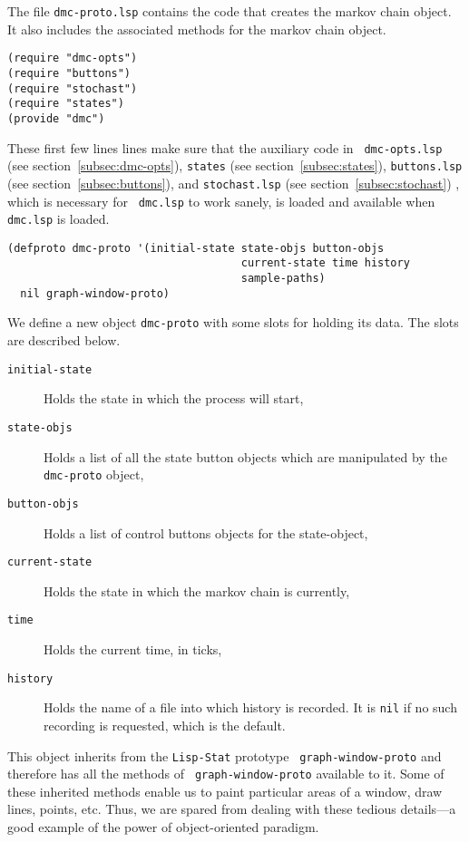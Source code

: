 The file {\tt dmc-proto.lsp} contains the code that creates the markov
chain object.  It also includes the associated methods for the markov
chain object. 
 
\begin{verbatim} 
(require "dmc-opts")
(require "buttons")
(require "stochast")
(require "states")
(provide "dmc")
\end{verbatim}

These first few lines lines make sure that the auxiliary code in {\tt
  dmc-opts.lsp} (see section~\ref{subsec:dmc-opts}), {\tt states}
(see section~\ref{subsec:states}), {\tt buttons.lsp} (see
section~\ref{subsec:buttons}), and {\tt stochast.lsp} (see
section~\ref{subsec:stochast}) , which is necessary for {\tt
  dmc.lsp} to work sanely, is loaded and available when {\tt dmc.lsp} is
loaded.
\begin{verbatim}
(defproto dmc-proto '(initial-state state-objs button-objs
                                    current-state time history
                                    sample-paths)
  nil graph-window-proto)
\end{verbatim}
We define a new object {\tt dmc-proto} with some slots for holding its
data. The slots are described below. 
\begin{description}
\item[{\tt initial-state}] Holds the state in which the process will
  start, 
\item[{\tt state-objs}] Holds a list of all the state button objects
  which are manipulated by the {\tt dmc-proto} object,
\item[{\tt button-objs}] Holds a list of control buttons objects for
  the state-object,
\item[{\tt current-state}] Holds the state in which the markov chain
  is currently,
\item[{\tt time}]  Holds the current time, in ticks,
\item[{\tt history}]  Holds the name of a file into which history is
  recorded. It is {\tt nil} if no such recording is requested, which
  is the default.
\end{description}
This object inherits from the {\tt Lisp-Stat} prototype {\tt
  graph-window-proto} and therefore has all the methods of {\tt
  graph-window-proto} available to it. Some of these inherited methods
enable us to paint particular areas of a window, draw lines, points,
etc. Thus, we are spared from dealing with these tedious details---a
good example of the power of object-oriented paradigm.  


